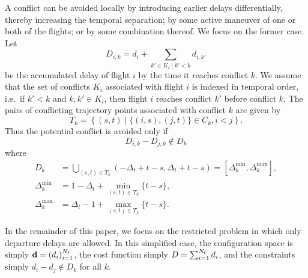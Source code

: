 A conflict can be avoided locally by introducing earlier delays differentially, thereby increasing the temporal separation; by some active maneuver of one or both of the flights; or by some combination thereof.
We focus on the former case.
Let 
\begin{equation}
D_{i, k} = d_i + \sum_{\left.k' \in K_i \middle| k' < k\right.} d_{i,k'}
\end{equation}
be the accumulated delay of flight $i$ by the time it reaches conflict $k$.
We assume that the set of conflicts $K_i$ associated with flight $i$ is indexed in temporal order, i.e.\ if $k' < k$ and $k, k' \in K_i$, then flight $i$ reaches conflict $k'$ before conflict $k$.
The pairs of conflicting trajectory points associated with conflict $k$ are given by 
\begin{equation}
T_k = 
\left\{
(s, t) \middle| \{(i, s), (j, t)\} \in C_k, i < j
\right\}.
\end{equation}
Thus the potential conflict is avoided only if 
\begin{equation}
D_{i, k} - D_{j, k}
\notin
D_k 
\end{equation}
where 
\begin{align}
D_k &= 
\bigcup_{(s, t) \in T_k}
\left(-\Delta_t + t - s, \Delta_t + t - s\right)
=
[\Delta^{\min}_k, \Delta^{\max}_k], \\
\Delta^{\min}_k &= 1 - \Delta_t + \min_{(s, t) \in T_k} \{t - s\},\\
\Delta^{\max}_k &= \Delta_t - 1 + \max_{(s, t) \in T_k} \{t - s\}.
\end{align}


In the remainder of this paper, we focus on the restricted problem in which only departure delays are allowed.
In this simplified case, the configuration space is simply 
$\mathbf d = {\left(d_i\right)}_{i=1}^{N_{\mathrm{f}}}$, the cost function simply $D = \sum_{i = 1}^{N_{\mathrm{f}}} d_i$, and the constraints simply $d_i - d_j \notin D_k$ for all $k$.

